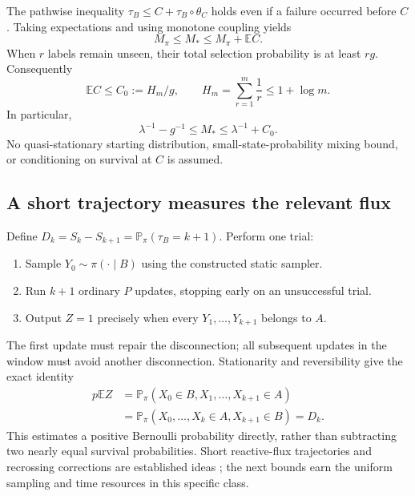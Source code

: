 \documentclass[11pt,a4paper]{article}
\newcommand{\E}{\mathbb E}
\newcommand{\Pp}{\mathbb P}
\begin{document}
The pathwise inequality $\tau_B\le C+\tau_B\circ\theta_C$ holds even if a failure occurred before $C$. Taking expectations and using monotone coupling yields
\begin{equation}
 M_\pi\le M_*\le M_\pi+\E C.\label{eq:join}
\end{equation}
When $r$ labels remain unseen, their total selection probability is at least $rg$. Consequently
\[
 \E C\le C_0:=H_m/g,\qquad H_m=\sum_{r=1}^m\frac1r\le1+\log m.
\]
In particular,
\begin{equation}
 \lambda^{-1}-g^{-1}\le M_*\le\lambda^{-1}+C_0.\label{eq:allmean}
\end{equation}
No quasi-stationary starting distribution, small-state-probability mixing bound, or conditioning on survival at $C$ is assumed.

\subsection{A short trajectory measures the relevant flux}
Define $D_k=S_k-S_{k+1}=\Pp_\pi(\tau_B=k+1)$. Perform one trial:
\begin{enumerate}
\item Sample $Y_0\sim\pi(\cdot\mid B)$ using the constructed static sampler.
\item Run $k+1$ ordinary $P$ updates, stopping early on an unsuccessful trial.
\item Output $Z=1$ precisely when every $Y_1,\ldots,Y_{k+1}$ belongs to $A$.
\end{enumerate}
The first update must repair the disconnection; all subsequent updates in the window must avoid another disconnection. Stationarity and reversibility give the exact identity
\begin{align}
 p\E Z
 &=\Pp_\pi(X_0\in B,X_1,\ldots,X_{k+1}\in A)\nonumber\\
 &=\Pp_\pi(X_0,\ldots,X_k\in A,X_{k+1}\in B)=D_k.\label{eq:reverse}
\end{align}
This estimates a positive Bernoulli probability directly, rather than subtracting two nearly equal survival probabilities. Short reactive-flux trajectories and recrossing corrections are established ideas \cite{prinz}; the next bounds earn the uniform sampling and time resources in this specific class.
\end{document}
